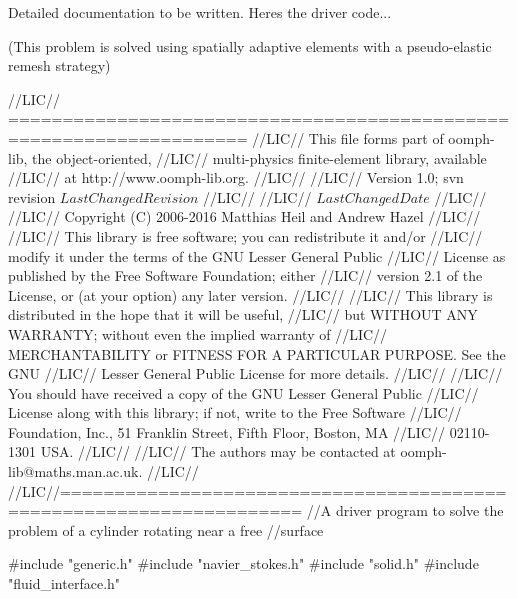 Detailed documentation to be written. Here\textquotesingle{}s the driver code...

(This problem is solved using spatially adaptive elements with a pseudo-\/elastic remesh strategy)


\begin{DoxyCodeInclude}
\textcolor{comment}{//LIC// ====================================================================}
\textcolor{comment}{//LIC// This file forms part of oomph-lib, the object-oriented, }
\textcolor{comment}{//LIC// multi-physics finite-element library, available }
\textcolor{comment}{//LIC// at http://www.oomph-lib.org.}
\textcolor{comment}{//LIC// }
\textcolor{comment}{//LIC//    Version 1.0; svn revision $LastChangedRevision$}
\textcolor{comment}{//LIC//}
\textcolor{comment}{//LIC// $LastChangedDate$}
\textcolor{comment}{//LIC// }
\textcolor{comment}{//LIC// Copyright (C) 2006-2016 Matthias Heil and Andrew Hazel}
\textcolor{comment}{//LIC// }
\textcolor{comment}{//LIC// This library is free software; you can redistribute it and/or}
\textcolor{comment}{//LIC// modify it under the terms of the GNU Lesser General Public}
\textcolor{comment}{//LIC// License as published by the Free Software Foundation; either}
\textcolor{comment}{//LIC// version 2.1 of the License, or (at your option) any later version.}
\textcolor{comment}{//LIC// }
\textcolor{comment}{//LIC// This library is distributed in the hope that it will be useful,}
\textcolor{comment}{//LIC// but WITHOUT ANY WARRANTY; without even the implied warranty of}
\textcolor{comment}{//LIC// MERCHANTABILITY or FITNESS FOR A PARTICULAR PURPOSE.  See the GNU}
\textcolor{comment}{//LIC// Lesser General Public License for more details.}
\textcolor{comment}{//LIC// }
\textcolor{comment}{//LIC// You should have received a copy of the GNU Lesser General Public}
\textcolor{comment}{//LIC// License along with this library; if not, write to the Free Software}
\textcolor{comment}{//LIC// Foundation, Inc., 51 Franklin Street, Fifth Floor, Boston, MA}
\textcolor{comment}{//LIC// 02110-1301  USA.}
\textcolor{comment}{//LIC// }
\textcolor{comment}{//LIC// The authors may be contacted at oomph-lib@maths.man.ac.uk.}
\textcolor{comment}{//LIC// }
\textcolor{comment}{//LIC//====================================================================}
\textcolor{comment}{//A driver program to solve the problem of a cylinder rotating near a free}
\textcolor{comment}{//surface}

\textcolor{preprocessor}{#include "generic.h"}
\textcolor{preprocessor}{#include "navier\_stokes.h"}
\textcolor{preprocessor}{#include "solid.h"}
\textcolor{preprocessor}{#include "fluid\_interface.h"}


\end{DoxyCodeInclude}
